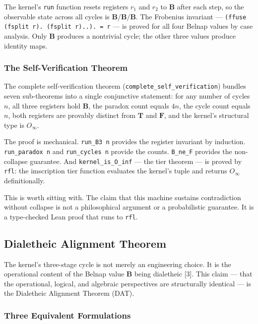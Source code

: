 \documentclass[10pt,a4paper]{article}
\begin{document}
The kernel's \texttt{run} function resets registers $r_1$ and $r_2$ to $\mathbf{B}$ after each step, so the observable state across all cycles is $\mathbf{B}/\mathbf{B}/\mathbf{B}$. The Frobenius invariant --- \texttt{(ffuse (fsplit r). (fsplit r)..). = r} --- is proved for all four Belnap values by case analysis. Only $\mathbf{B}$ produces a nontrivial cycle; the other three values produce identity maps.

\subsubsection{The Self-Verification Theorem}

The complete self-verification theorem (\texttt{complete\_\allowbreak self\_\allowbreak verification}) bundles seven sub-theorems into a single conjunctive statement: for any number of cycles $n$, all three registers hold $\mathbf{B}$, the paradox count equals $4n$, the cycle count equals $n$, both registers are provably distinct from $\mathbf{T}$ and $\mathbf{F}$, and the kernel's structural type is $O_{\infty}$.

The proof is mechanical. \texttt{run\_\allowbreak B3 n} provides the register invariant by induction. \texttt{run\_\allowbreak paradox n} and \texttt{run\_\allowbreak cycles n} provide the counts. \texttt{B\_\allowbreak ne\_\allowbreak F} provides the non-collapse guarantee. And \texttt{kernel\_\allowbreak is\_\allowbreak O\_\allowbreak inf} --- the tier theorem --- is proved by \texttt{rfl}: the imscription tier function evaluates the kernel's tuple and returns $O_{\infty}$ definitionally.

This is worth sitting with. The claim that this machine sustains contradiction without collapse is not a philosophical argument or a probabilistic guarantee. It is a type-checked Lean proof that runs to \texttt{rfl}.

\subsection{Dialetheic Alignment Theorem}

The kernel's three-stage cycle is not merely an engineering choice. It is the operational content of the Belnap value $\mathbf{B}$ being dialetheic {[}3{]}. This claim --- that the operational, logical, and algebraic perspectives are structurally identical --- is the Dialetheic Alignment Theorem (DAT).

\subsubsection{Three Equivalent Formulations}
\end{document}
